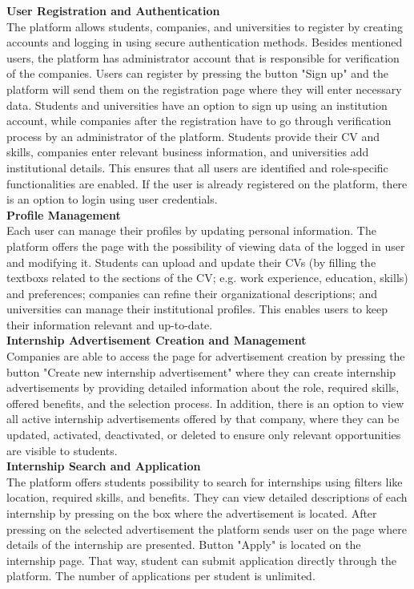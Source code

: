 \quad \textbf{User Registration and Authentication} \\
The platform allows students, companies, and universities to register by creating accounts and logging in using secure authentication methods. Besides mentioned users, the platform has administrator account that is responsible for verification of the companies. Users can register by pressing the button "Sign up" and the platform will send them on the registration page where they will enter necessary data. Students and universities have an option to sign up using an institution account, while companies after the registration have to go through verification process by an administrator of the platform. Students provide their CV and skills, companies enter relevant business information, and universities add institutional details. This ensures that all users are identified and role-specific functionalities are enabled. If the user is already registered on the platform, there is an option to login using user credentials. \\

\textbf{Profile Management} \\
Each user can manage their profiles by updating personal information. The platform offers the page with the possibility of viewing data of the logged in user and modifying it. Students can upload and update their CVs (by filling the textboxs related to the sections of the CV; e.g. work experience, education, skills) and preferences; companies can refine their organizational descriptions; and universities can manage their institutional profiles. This enables users to keep their information relevant and up-to-date. \\

\textbf{Internship Advertisement Creation and Management} \\
Companies are able to access the page for advertisement creation by pressing the button "Create new internship advertisement" where they can create internship advertisements by providing detailed information about the role, required skills, offered benefits, and the selection process. In addition, there is an option to view all active internship advertisements offered by that company, where they can be updated, activated, deactivated, or deleted to ensure only relevant opportunities are visible to students. \\

\textbf{Internship Search and Application} \\
The platform offers students possibility to search for internships using filters like location, required skills, and benefits. They can view detailed descriptions of each internship by pressing on the box where the advertisement is located. After pressing on the selected advertisement the platform sends user on the page where details of the internship are presented. Button "Apply" is located on the internship page. That way, student can submit application directly through the platform. The number of applications per student is unlimited. \\

